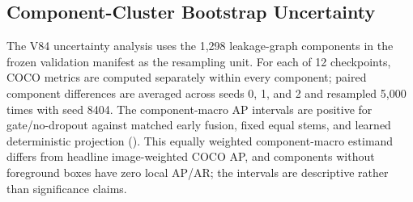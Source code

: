 \subsection{Component-Cluster Bootstrap Uncertainty}
The V84 uncertainty analysis uses the 1,298 leakage-graph components in the frozen validation manifest as the resampling unit. For each of 12 checkpoints, COCO metrics are computed separately within every component; paired component differences are averaged across seeds 0, 1, and 2 and resampled 5,000 times with seed 8404. The component-macro AP intervals are positive for gate/no-dropout against matched early fusion, fixed equal stems, and learned deterministic projection (). This equally weighted component-macro estimand differs from headline image-weighted COCO AP, and components without foreground boxes have zero local AP/AR; the intervals are descriptive rather than significance claims.
